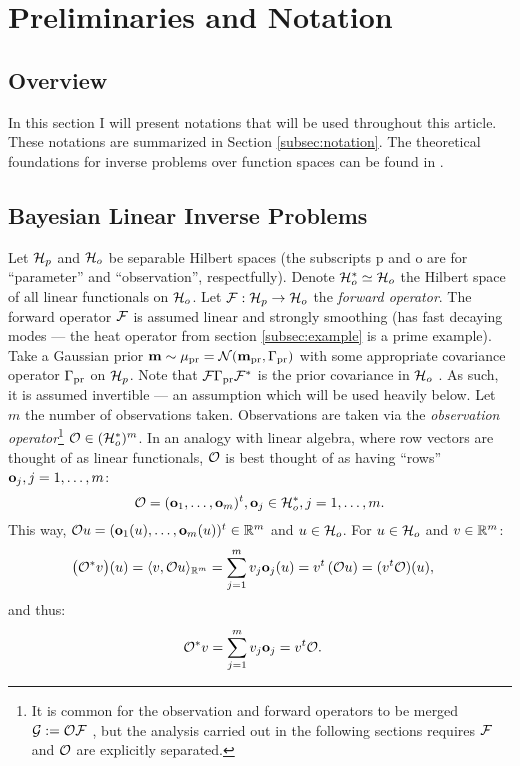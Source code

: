 \section{Preliminaries and Notation}\label{section:prelim}

\subsection{Overview}
In this section I will present notations that will be used throughout
this article. These notations are summarized in Section
\ref{subsec:notation}. The theoretical foundations for inverse
problems over function spaces can be found in \cite{Stuart10}.

\subsection{Bayesian Linear Inverse Problems}\label{subsec:abstract OED}
Let $\mathcal{H}_p$ and $\mathcal{H}_o$ be separable Hilbert spaces (the subscripts p
and o are for ``parameter'' and ``observation'', respectfully). Denote
$\mathcal{H}_o^* \simeq \mathcal{H}_o$ the Hilbert space of all linear functionals on
$\mathcal{H}_o$. Let $\mathcal{F}: \mathcal{H}_p \to \mathcal{H}_o$ the \emph{forward operator}. The
forward operator $\mathcal{F}$ is assumed linear and strongly smoothing (has
fast decaying modes --- the heat operator from section
\ref{subsec:example} is a prime example). Take a Gaussian prior
$\mathbf{m} \sim \mu_{\textup{pr}} = \mathcal{N}(\mathbf{m}_{\textup{pr}} ,\Gamma_{\textup{pr}})$ with some appropriate
covariance operator $\Gamma_{\textup{pr}}$ \cite{Stuart10} on $\mathcal{H}_p$. Note that
$\mathcal{F} \Gamma_{\textup{pr}} \mathcal{F}^*$ is the prior covariance in $\mathcal{H}_o$
\cite{Stuart10}. As such, it is assumed invertible --- an assumption
which will be used heavily below. Let $m$ the number of observations
taken. Observations are taken via the \emph{observation
operator}\footnote{It is common for the observation and forward
operators to be merged $\mathcal{G} := \mathcal{O} \mathcal{F}$
\cite{AlexanderianGloorGhattas14}, but the analysis carried out in the
following sections requires $\mathcal{F}$ and $\mathcal{O}$ are explicitly
separated.} $\mathcal{O} \in ( \mathcal{H}_o^* )^m$. In an analogy with linear
algebra, where row vectors are thought of as linear functionals,
$\mathcal{O}$ is best thought of as having ``rows'' $\mathbf{o}_j, j=1,\dots,m$:
\begin{equation}\label{eq:O}
  \obs = (\meas_1,\dots, \meas_m)^t, \meas_j \in \hilo^*, j = 1,\dots,m.
\end{equation}
This way, $\mathcal{O} u = (\mathbf{o}_1(u), \dots, \mathbf{o}_m(u) )^t \in \mathbb{R}^m$ and
$u \in \mathcal{H}_o$.
For $u \in \mathcal{H}_o$ and $v\in \mathbb{R}^m$:
\begin{align*}
  \big (\obs^*v \big ) (u) &= \langle v, \obs u \rangle_{\R^m} = \sum_{j=1}^m  v_j \meas_j(u)
  = v^t \left ( \obs u \right ) = (v^t \obs) (u),
\end{align*}
and thus:
\begin{align}\label{eq:obs*}
  \obs^*v &= \sum_{j=1}^m v_j \meas_j = v^t \obs.
\end{align}

